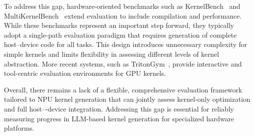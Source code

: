 To address this gap, hardware-oriented benchmarks such as KernelBench~\cite{ouyang2025kernelbench} and MultiKernelBench~\cite{wen2025multikernelbench} extend evaluation to include compilation and performance. While these benchmarks represent an important step forward, they typically adopt a single-path evaluation paradigm that requires generation of complete host–device code for all tasks. This design introduces unnecessary complexity for simple kernels and limits flexibility in assessing different levels of kernel abstraction. More recent systems, such as TritonGym~\cite{anonymous2025tritongym}, provide interactive and tool-centric evaluation environments for GPU kernels.

Overall, there remains a lack of a flexible, comprehensive evaluation framework tailored to NPU kernel generation that can jointly assess kernel-only optimization and full host–-device integration. Addressing this gap is essential for reliably measuring progress in LLM-based kernel generation for specialized hardware platforms.